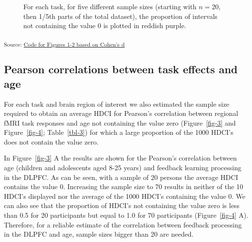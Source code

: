 \documentclass[
  letterpaper,
  DIV=11,
  numbers=noendperiod]{scrartcl}
\begin{document}
\begin{figure}[H]


\caption{\label{fig-2}For each task, for five different sample sizes
(starting with \(n=20\), then 1/5th parts of the total dataset), the
proportion of intervals not containing the value 0 is plotted in reddish
purple.}

\end{figure}%

\textsubscript{Source:
\href{https://eduardklap.github.io/sample-size-fmri/notebooks/figures-cohens_d-preview.html\#cell-fig-2}{Code
for Figures 1-2 based on Cohen's d}}

\subsection{Pearson correlations between task effects and
age}\label{pearson-correlations-between-task-effects-and-age}

For each task and brain region of interest we also estimated the sample
size required to obtain an average HDCI for Pearson's correlation
between regional fMRI task responses and age not containing the value
zero (Figure~\ref{fig-3} and Figure~\ref{fig-4}; Table~\ref{tbl-3}) for
which a large proportion of the 1000 HDCI's does not contain the value
zero.

In Figure~\ref{fig-3} A the results are shown for the Pearson's
correlation between age (children and adolescents aged 8-25 years) and
feedback learning processing in the DLPFC. As can be seen, with a sample
of 20 persons the average HDCI contains the value 0. Increasing the
sample size to 70 results in neither of the 10 HDCI's displayed nor the
average of the 1000 HDCI's containing the value 0. We can also see that
the proportion of HDCI's not containing the value zero is less than 0.5
for 20 participants but equal to 1.0 for 70 participants
(Figure~\ref{fig-4} A). Therefore, for a reliable estimate of the
correlation between feedback processing in the DLPFC and age, sample
sizes bigger than 20 are needed.
\end{document}
